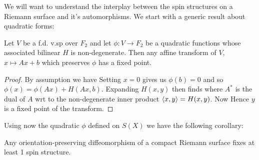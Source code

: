 \documentclass{article}
\begin{document}
We will want to understand the interplay between the spin structures on a Riemann surface and it's automorphisms. We start with a generic result about quadratic forms:

\begin{lemma}\label{lemma: preserving quadratic gives fixed point}
	Let $V$ be a f.d. v.sp over $F_2$ and let $\phi:V \to F_2$ be a quadratic functions whose associated bilinear $H$ is non-degenerate. Then any affine transform of $V$, $x \mapsto Ax+b$ which preserves $\phi$ has a fixed point.  
\end{lemma}
\begin{proof}
	By assumption we have
Setting $x=0$ gives us $\phi(b)=0$ and so $\phi(x) = \phi(Ax)+H(Ax,b)$. Expanding $H(x,y)$ then finds 
where $A^\ast$ is the dual of $A$ wrt to the non-degenerate inner product $\left\langle x,y \right\rangle = H(x,y)$. Now 
Hence $y$ is a fixed point of the transform. 
\end{proof}

Using now the quadratic $\phi$ defined on $S(X)$ we have the following corollary:

\begin{corollary}
	Any orientation-preserving diffeomorphism of a compact Riemann surface fixes at least 1 spin structure.
\end{corollary}
\end{document}
